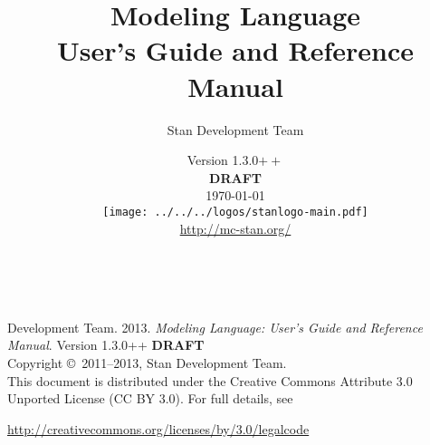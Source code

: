 \title{\Huge\bf \Stan Modeling Language \\[4pt] {\LARGE User's Guide
    and Reference Manual}}
\author{Stan Development Team
}

\date{\vspace*{36pt} \Stan Version
1.3.0$++$\\[8pt]{\LARGE\bf DRAFT}
\\[4pt] {\small \today}
\\[36pt]
{
\vfill
\texttt{[image: ../../../logos/stanlogo-main.pdf]}}
\\
\vspace*{6pt}
{\small \url{http://mc-stan.org/}}
}
\maketitle

\newpage
\thispagestyle{empty}
\mbox{ }
\vfill
\begin{center}
\begin{minipage}[t]{0.75\textwidth}
\small
\Stan Development Team. 2013.  
{\it \Stan Modeling Language: User's Guide and Reference Manual}. Version
1.3.0++ {\bf DRAFT}
\vspace*{20pt}
\mbox{ }
\\
Copyright \copyright \ 2011--2013, Stan Development Team.
\vspace*{28pt}
\mbox{} \\
This document is distributed under the Creative Commons Attribute 3.0
Unported License (CC BY 3.0).  For full details, see
\begin{center}
\url{http://creativecommons.org/licenses/by/3.0/legalcode} 
\end{center}
\end{minipage}
\vspace*{24pt}
\mbox{ }
\end{center}
